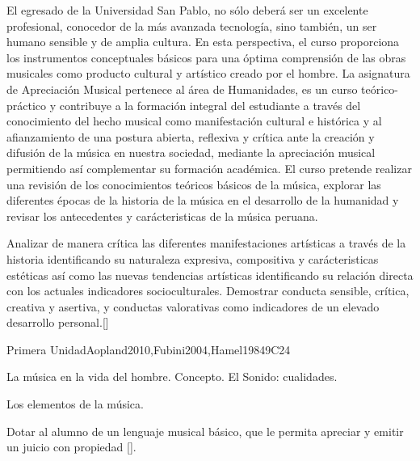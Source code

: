 \begin{syllabus}


\begin{justification}
El egresado de la Universidad San Pablo, no sólo deberá ser un excelente profesional, conocedor de la más avanzada tecnología, sino también, un ser humano sensible y de amplia cultura. En esta perspectiva, el curso proporciona los instrumentos conceptuales básicos para una óptima comprensión de las obras musicales como producto cultural y artístico creado por el hombre.
La asignatura de Apreciación Musical pertenece al área de Humanidades, es  un curso teórico-práctico y contribuye a la formación integral del estudiante a través del  conocimiento del hecho musical como manifestación cultural e histórica y al afianzamiento de una postura abierta, reflexiva y crítica ante la creación y difusión de la música en nuestra sociedad, mediante la apreciación musical permitiendo así­  complementar  su formación académica. El curso pretende realizar una revisión de los conocimientos teóricos básicos de la música, explorar las diferentes épocas de la historia de la música en el desarrollo de la humanidad y revisar los antecedentes y carácteristicas de la música peruana.
\end{justification}

\begin{goals}
\item Analizar de manera crítica las diferentes manifestaciones artísticas a través de la historia identificando su naturaleza expresiva, compositiva y carácteristicas estéticas así­ como las nuevas tendencias artísticas identificando su relación directa con los actuales indicadores socioculturales. Demostrar conducta sensible, crítica, creativa y asertiva, y conductas valorativas como indicadores de un elevado desarrollo personal.[\Familiarity]
\end{goals}

\begin{outcomes}
    \item {}
\end{outcomes}
\begin{competences}
    \item {}
\end{competences}

\begin{unit}{}{Primera Unidad}{Aopland2010,Fubini2004,Hamel1984}{9}{C24}
\begin{topics}
	\item La música en la vida del hombre. 
		\subitem Concepto. 
		\subitem El Sonido: cualidades.
	\item Los elementos de la música. 
\end{topics}
\begin{learningoutcomes}
	\item Dotar al alumno de un lenguaje musical básico, que le permita apreciar y emitir un juicio con propiedad [\Usage].
\end{learningoutcomes}
\end{unit}


\end{syllabus}

